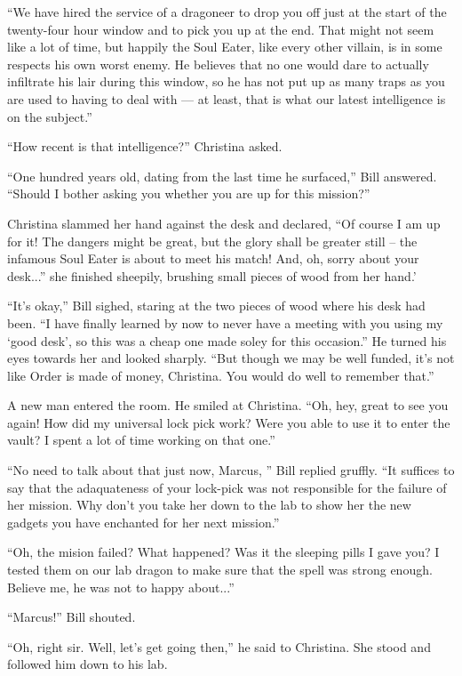 \documentclass[showtrims,b6paper,draft,10pt]{memoir}
\begin{document}
``We have hired the service of a dragoneer to drop you off just at the start of the twenty-four hour window and to pick you up at the end.  That might not seem like a lot of time, but happily the Soul Eater, like every other villain, is in some respects his own worst enemy.  He believes that no one would dare to actually infiltrate his lair during this window, so he has not put up as many traps as you are used to having to deal with --- at least, that is what our latest intelligence is on the subject.''

``How recent is that intelligence?''  Christina asked.

``One hundred years old, dating from the last time he surfaced,''  Bill answered.  ``Should I bother asking you whether you are up for this mission?''

Christina slammed her hand against the desk and declared, ``Of course I am up for it!  The dangers might be great, but the glory shall be greater still -- the infamous Soul Eater is about to meet his match!  And, oh, sorry about your desk...''  she finished sheepily, brushing small pieces of wood from her hand.'

``It's okay,'' Bill sighed, staring at the two pieces of wood where his desk had been.  ``I have finally learned by now to never have a meeting with you using my `good desk', so this was a cheap one made soley for this occasion.''  He turned his eyes towards her and looked sharply.  ``But though we may be well funded, it's not like Order is made of money, Christina.  You would do well to remember that.''

A new man entered the room.  He smiled at Christina.  ``Oh, hey, great to see you again!  How did my universal lock pick work?  Were you able to use it to enter the vault?  I spent a lot of time working on that one.''

``No need to talk about that just now, Marcus, '' Bill replied gruffly.  ``It suffices to say that the adaquateness of your lock-pick was not responsible for the failure of her mission.  Why don't you take her down to the lab to show her the new gadgets you have enchanted for her next mission.''

``Oh, the mision failed?  What happened?  Was it the sleeping pills I gave you?  I tested them on our lab dragon to make sure that the spell was strong enough.  Believe me, he was not to happy about...''

``Marcus!''  Bill shouted.

``Oh, right sir.  Well, let's get going then,'' he said to Christina.  She stood and followed him down to his lab.
\end{document}
